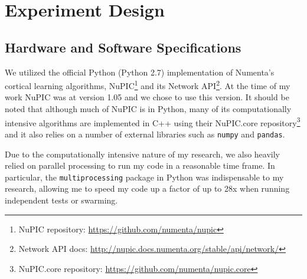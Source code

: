 \documentclass[oneside,12pt,openany]{book}
\begin{document}
	
	
    
    
    
    
    
	
	
	\chapter{Experiment Design}
	
	\section{Hardware and Software Specifications}
	
	We utilized the official Python (Python 2.7) implementation of Numenta's cortical learning algorithms, NuPIC\footnote{NuPIC repository: \href{https://github.com/numenta/nupic}{\ttfamily https://github.com/numenta/nupic} } and its Network API\footnote{Network API docs: \href{http://nupic.docs.numenta.org/stable/api/network/}{\ttfamily http://nupic.docs.numenta.org/stable/api/network/}}. At the time of my work NuPIC was at version 1.05 and we chose to use this version. It should be noted that although much of NuPIC is in Python, many of its computationally intensive algorithms are implemented in C++ using their NuPIC.core repository\footnote{NuPIC.core repository: \href{https://github.com/numenta/nupic.core}{\ttfamily https://github.com/numenta/nupic.core}} and it also relies on a number of external libraries such as \texttt{numpy} and \texttt{pandas}. 
	
	Due to the computationally intensive nature of my research, we also heavily relied on parallel processing to run my code in a reasonable time frame. In particular, the \texttt{multiprocessing} package in Python was indispensable to my research, allowing me to speed my code up a factor of up to 28x when running independent tests or swarming.
	
\end{document}
